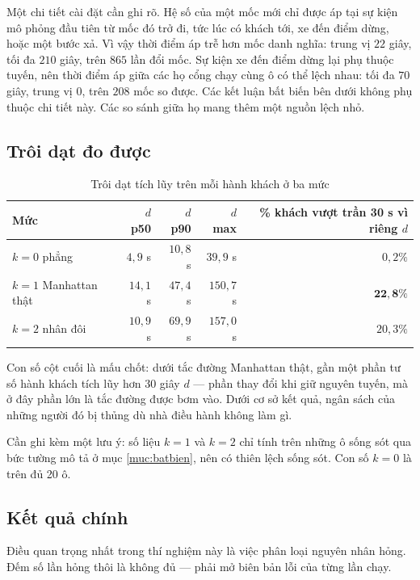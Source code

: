 Một chi tiết cài đặt cần ghi rõ. Hệ số của một mốc mới chỉ được áp tại sự kiện mô phỏng đầu tiên từ
mốc đó trở đi, tức lúc có khách tới, xe đến điểm dừng, hoặc một bước xả. Vì vậy thời điểm áp trễ hơn
mốc danh nghĩa: trung vị $22$ giây, tối đa $210$ giây, trên $865$ lần đổi mốc. Sự kiện xe đến điểm
dừng lại phụ thuộc tuyến, nên thời điểm áp giữa các họ cổng chạy cùng ô có thể lệch nhau: tối đa $70$
giây, trung vị $0$, trên $208$ mốc so được. Các kết luận bất biến bên dưới không phụ thuộc chi tiết
này. Các so sánh giữa họ mang thêm một nguồn lệch nhỏ.

\subsection{Trôi dạt đo được}

\begin{table}[htbp]
\centering
\caption{Trôi dạt tích lũy trên mỗi hành khách ở ba mức}
\label{bang:troidat}
\small
\begin{tabular}{@{}lrrrr@{}}
\toprule
\textbf{Mức} & $d$ \textbf{p50} & $d$ \textbf{p90} & $d$ \textbf{max} & \textbf{\% khách vượt trần 30 s vì riêng $d$}\\
\midrule
$k=0$ phẳng & $4{,}9$ s & $10{,}8$ s & $39{,}9$ s & $0{,}2\%$\\
$k=1$ Manhattan thật & $14{,}1$ s & $47{,}4$ s & $150{,}7$ s & $\mathbf{22{,}8\%}$\\
$k=2$ nhân đôi & $10{,}9$ s & $69{,}9$ s & $157{,}0$ s & $20{,}3\%$\\
\bottomrule
\end{tabular}
\end{table}

Con số cột cuối là mấu chốt: dưới tắc đường Manhattan thật, gần một phần tư số hành khách tích
lũy hơn 30 giây $d$ --- phần thay đổi khi giữ nguyên tuyến, mà ở đây phần lớn là tắc đường được bơm
vào. Dưới cơ sở kết quả, ngân sách của những người đó bị thủng dù nhà điều hành không làm gì.

Cần ghi kèm một lưu ý: số liệu $k=1$ và $k=2$ chỉ tính trên những ô sống sót qua bức tường mô tả
ở mục \ref{muc:batbien}, nên có thiên lệch sống sót. Con số $k=0$ là trên đủ 20 ô.

\subsection{Kết quả chính}

Điều quan trọng nhất trong thí nghiệm này là việc phân loại nguyên nhân hỏng. Đếm số lần hỏng
thôi là không đủ --- phải mở biên bản lỗi của từng lần chạy.

